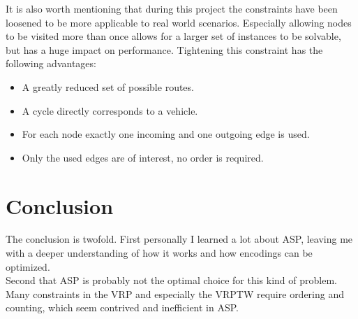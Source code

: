 \documentclass[12pt, letterpaper]{article}
\begin{document}
It is also worth mentioning that during this project the constraints have been loosened to be more applicable to real world scenarios. Especially allowing nodes to be visited more than once allows for a larger set of instances to be solvable, but has a huge impact on performance. Tightening this constraint has the following advantages:
\begin{itemize}
	\item A greatly reduced set of possible routes.
	\item A cycle directly corresponds to a vehicle.
	\item For each node exactly one incoming and one outgoing edge is used.
	\item Only the used edges are of interest, no order is required.
\end{itemize}

\section{Conclusion}
The conclusion is twofold. First personally I learned a lot about ASP, leaving me with a deeper understanding of how it works and how encodings can be optimized.\\
Second that ASP is probably not the optimal choice for this kind of problem. Many constraints in the VRP and especially the VRPTW require ordering and counting, which seem contrived and inefficient in ASP.



\end{document}
